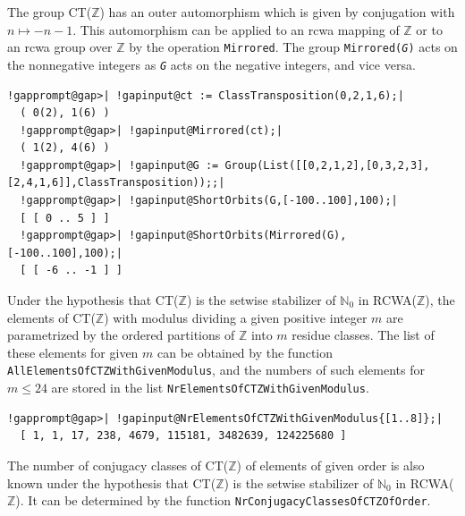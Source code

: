 \documentclass[a4paper,11pt]{report}
\begin{document}
{{  The group CT({\ensuremath{\mathbb Z}}) has an outer automorphism which is
given by conjugation with $n \mapsto -n - 1$. This automorphism can be applied to an rcwa mapping of {\ensuremath{\mathbb
Z}} or to an rcwa group over {\ensuremath{\mathbb Z}} by the operation \texttt{Mirrored}. The group \texttt{Mirrored(}\mbox{\texttt{\mdseries\slshape G}}\texttt{)} acts on the nonnegative integers as \mbox{\texttt{\mdseries\slshape G}} acts on the negative integers, and vice versa. 
\begin{Verbatim}[commandchars=!@|,fontsize=\small,frame=single,label=Example]
  !gapprompt@gap>| !gapinput@ct := ClassTransposition(0,2,1,6);|
  ( 0(2), 1(6) )
  !gapprompt@gap>| !gapinput@Mirrored(ct);|
  ( 1(2), 4(6) )
  !gapprompt@gap>| !gapinput@G := Group(List([[0,2,1,2],[0,3,2,3],[2,4,1,6]],ClassTransposition));;|
  !gapprompt@gap>| !gapinput@ShortOrbits(G,[-100..100],100);|
  [ [ 0 .. 5 ] ]
  !gapprompt@gap>| !gapinput@ShortOrbits(Mirrored(G),[-100..100],100);|
  [ [ -6 .. -1 ] ]
\end{Verbatim}
   Under the hypothesis that CT({\ensuremath{\mathbb Z}}) is the setwise
stabilizer of ${\ensuremath{\mathbb N}}_0$ in RCWA({\ensuremath{\mathbb Z}}), the elements of CT({\ensuremath{\mathbb
Z}}) with modulus dividing a given positive integer $m$ are parametrized by the ordered partitions of {\ensuremath{\mathbb Z}} into $m$ residue classes. The list of these elements for given $m$ can be obtained by the function \texttt{AllElementsOfCTZWithGivenModulus}, and the numbers of such elements for $m \leq 24$ are stored in the list \texttt{NrElementsOfCTZWithGivenModulus}. 
\begin{Verbatim}[commandchars=!@|,fontsize=\small,frame=single,label=Example]
  !gapprompt@gap>| !gapinput@NrElementsOfCTZWithGivenModulus{[1..8]};|
  [ 1, 1, 17, 238, 4679, 115181, 3482639, 124225680 ]
\end{Verbatim}
  The number of conjugacy classes of CT({\ensuremath{\mathbb Z}}) of elements of
given order is also known under the hypothesis that CT({\ensuremath{\mathbb
Z}}) is the setwise stabilizer of ${\ensuremath{\mathbb N}}_0$ in RCWA({\ensuremath{\mathbb Z}}). It can be determined by the function \texttt{NrConjugacyClassesOfCTZOfOrder}. }

  
}
\end{document}
